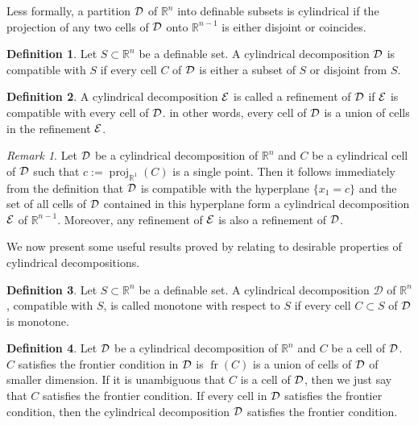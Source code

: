 \documentclass[
]{book}
\theoremstyle{definition}
\newtheorem{definition}{Definition}[chapter]
\theoremstyle{definition}
\theoremstyle{definition}
\theoremstyle{definition}
\theoremstyle{remark}
\newtheorem*{remark}{Remark}
\begin{document}
Less formally, a partition \(\cal D\) of \(\mathbb{R}^n\) into definable subsets is cylindrical if the projection of any two cells of \(\cal D\) onto \(\mathbb{R}^{n-1}\) is either disjoint or coincides.

\begin{definition}
Let \(S \subset \mathbb{R}^n\) be a definable set. A cylindrical decomposition \(\cal D\) is compatible with \(S\) if every cell \(C\) of \(\cal D\) is either a subset of \(S\) or disjoint from \(S\).
\end{definition}

\begin{definition}
A cylindrical decomposition \(\cal E\) is called a refinement of \(\cal D\) if \(\cal E\) is compatible with every cell of \(\cal D\). in other words, every cell of \(\cal D\) is a union of cells in the refinement \(\cal E\).
\end{definition}

\begin{remark}
\citep[Remark 3.8]{bgv15}
Let \(\cal D\) be a cylindrical decomposition of \(\mathbb{R}^n\) and \(C\) be a cylindrical cell of \(\cal D\) such that \(c := {\operatorname{proj}_{\mathbb{R}^{1}}}(C)\) is a single point. Then it follows immediately from the definition that \(\cal D\) is compatible with the hyperplane \(\{ x_1 = c \}\) and the set of all cells of \(\cal D\) contained in this hyperplane form a cylindrical decomposition \(\cal E\) of \(\mathbb{R}^{n-1}\). Moreover, any refinement of \(\cal E\) is also a refinement of \(\cal D\).
\end{remark}

We now present some useful results proved by \citet{bgv15} relating to desirable properties of cylindrical decompositions.

\begin{definition}
Let \(S \subset \mathbb{R}^n\) be a definable set. A cylindrical decomposition \(\mathcal{D}\) of \(\mathbb{R}^n\), compatible with \(S\), is called monotone with respect to \(S\) if every cell \(C \subset S\) of \(\cal D\) is monotone.
\end{definition}

\begin{definition}
\protect\hypertarget{def:frontier-condition}{}\label{def:frontier-condition}Let \(\cal D\) be a cylindrical decomposition of \(\mathbb{R}^n\) and \(C\) be a cell of \(\cal D\). \(C\) satisfies the frontier condition in \(\cal D\) is \({\operatorname{fr} \left( C \right)}\) is a union of cells of \(\cal D\) of smaller dimension. If it is unambiguous that \(C\) is a cell of \(\cal D\), then we just say that \(C\) satisfies the frontier condition.
If every cell in \(\cal D\) satisfies the frontier condition, then the cylindrical decomposition \(\cal D\) satisfies the frontier condition.
\end{definition}
\end{document}
